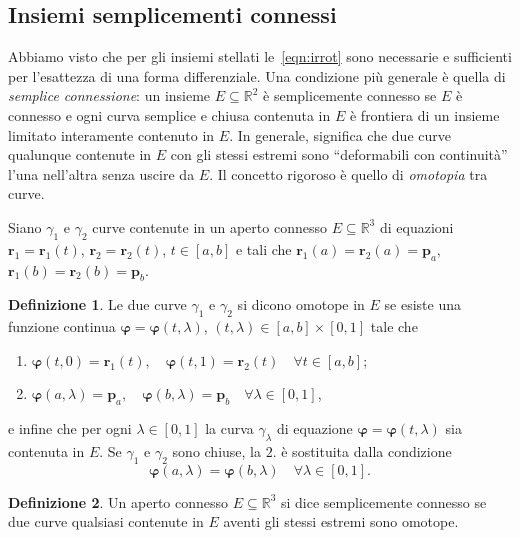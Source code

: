\documentclass[a4paper]{book}
\numberwithin{equation}{section}
\renewcommand{\phi}{\varphi}
\theoremstyle{plain}
\theoremstyle{definition}
\newtheorem{defn}{Definizione}[section]
\theoremstyle{remark}
\renewcommand{\vec}{\boldsymbol}
\theoremstyle{example}
\begin{document}
\subsection{Insiemi semplicementi connessi}
Abbiamo visto che per gli insiemi stellati le~\eqref{eqn:irrot} sono necessarie e sufficienti per l'esattezza di una forma differenziale. Una condizione più generale è quella di \emph{semplice connessione}: un insieme $E \subseteq \mathbb{R}^2$ è semplicemente connesso se $E$ è connesso e ogni curva semplice e chiusa contenuta in $E$ è frontiera di un insieme limitato interamente contenuto in $E$. In generale, significa che due curve qualunque contenute in $E$ con gli stessi estremi sono ``deformabili con continuità''  l'una nell'altra senza uscire da $E$. Il concetto rigoroso è quello di \emph{omotopia} tra curve.

Siano $\gamma_1$ e $\gamma_2$ curve contenute in un aperto connesso $E \subseteq \mathbb{R}^3$ di equazioni $\vec{r}_1 = \vec{r}_1(t)$, $\vec{r}_2 = \vec{r}_2(t)$, $t \in [a, b]$ e tali che $\vec{r}_1(a) = \vec{r}_2(a)=\vec{p}_a$, $\vec{r}_1(b) = \vec{r}_2(b) = \vec{p}_b$.

\begin{defn}
	Le due curve $\gamma_1$ e $\gamma_2$ si dicono omotope in $E$ se esiste una funzione continua $\vec{\phi} = \vec{\phi}(t, \lambda)$, $(t, \lambda) \in [a, b] \times [0, 1]$ tale che
	\begin{enumerate}
		\item $\vec{\phi}(t, 0) = \vec{r}_1(t), \quad \vec{\phi}(t, 1) = \vec{r}_2(t) \quad \forall t \in [a, b]$;
		\item $\vec{\phi}(a, \lambda) = \vec{p}_a, \quad \vec{\phi}(b, \lambda) = \vec{p}_b \quad \forall \lambda \in [0, 1] $,
	\end{enumerate}
	e infine che per ogni $\lambda \in [0, 1]$ la curva $\gamma_{\lambda}$ di equazione $\vec{\phi} = \vec{\phi}(t, \lambda)$ sia contenuta in $E$. Se $\gamma_1$ e $\gamma_2$ sono chiuse, la $2.$ è sostituita dalla condizione
	\begin{equation*}
		\vec{\phi}(a, \lambda) = \vec{\phi}(b, \lambda) \quad \forall \lambda \in [0, 1].
	\end{equation*}
\end{defn}

\begin{defn}
	Un aperto connesso $E \subseteq \mathbb{R}^3$ si dice semplicemente connesso se due curve qualsiasi contenute in $E$ aventi gli stessi estremi sono omotope.
\end{defn}
\end{document}
